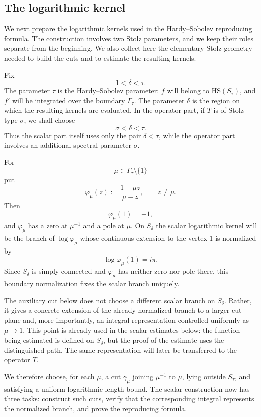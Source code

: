 \documentclass[11pt]{amsart}
\numberwithin{equation}{section}
\theoremstyle{definition}
\theoremstyle{plain}
\newcommand{\HS}{\mathrm{HS}}
\begin{document}
\subsection{The logarithmic kernel}\label{sec:HS-Stolz}

We next prepare the logarithmic kernels used in the Hardy--Sobolev reproducing
formula.  The construction involves two Stolz parameters, and we keep their
roles separate from the beginning.  We also collect here the elementary Stolz
geometry needed to build the cuts and to estimate the resulting kernels.

Fix
\[
        1<\delta<\tau .
\]
The parameter \(\tau\) is the Hardy--Sobolev parameter: \(f\) will belong to
\(\HS(S_\tau)\), and \(f'\) will be integrated over the boundary
\(\Gamma_\tau\).  The parameter \(\delta\) is the region on
which the resulting kernels are evaluated.  
In the operator part, if \(T\) is of Stolz type \(\sigma\), we shall choose
\[
        \sigma<\delta<\tau .
\]
Thus the scalar part itself uses only the pair \(\delta<\tau\), while the
operator part 
involves an additional spectral parameter \(\sigma\). 

For
\[
        \mu\in\Gamma_\tau\setminus\{1\}
\]
put
\[
        \varphi_\mu(z):=\frac{1-\mu z}{\mu-z},
        \qquad z\ne\mu .
\]
Then
\[
        \varphi_\mu(1)=-1,
\]
and \(\varphi_\mu\) has a zero at \(\mu^{-1}\) and a pole at \(\mu\).  
On \(S_\delta\) the scalar logarithmic kernel will be the branch of
\(\log\varphi_\mu\) whose continuous extension to the vertex \(1\)
is normalized by
\[
        \log\varphi_\mu(1)=i\pi.
\]
Since \(S_\delta\) is simply connected and \(\varphi_\mu\) has neither
zero nor pole there, this boundary normalization fixes the scalar
branch uniquely.

The auxiliary cut below does not choose a different scalar branch on
\(S_\delta\).  Rather, it gives a concrete extension of the already normalized
branch to a larger cut plane and, more importantly, an integral representation
controlled uniformly as \(\mu\to1\).  This point is already used
in the scalar estimates below: the function being estimated is defined on
\(S_\delta\), but the proof of the estimate uses the distinguished path.  The
same representation will later be transferred to the operator \(T\).

We therefore choose, for each \(\mu\), a cut \(\gamma_\mu\) joining
\(\mu^{-1}\) to \(\mu\), lying outside \(S_\tau\), and satisfying a uniform
logarithmic-length bound.  The scalar construction now has three tasks:
construct such cuts, verify that the corresponding integral represents the
normalized branch, and prove the reproducing formula.
\end{document}
